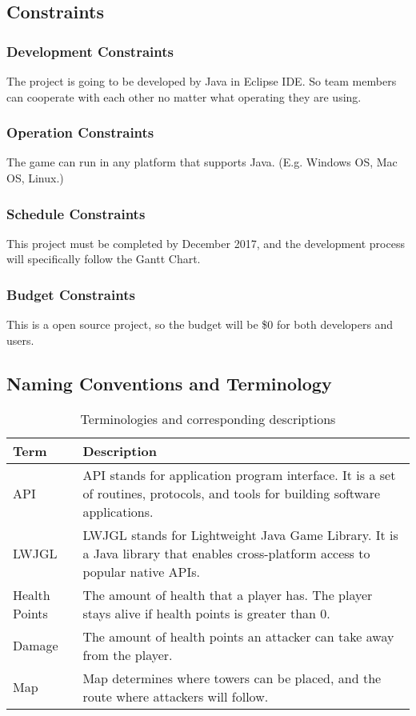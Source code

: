 \documentclass[12pt]{article}
\begin{document}
\subsection{Constraints}
\subsubsection{Development Constraints}
The project is going to be developed by Java in Eclipse IDE. So team members can cooperate with each other no matter what operating they are using.

\subsubsection{Operation Constraints}
The game can run in any platform that supports Java. (E.g. Windows OS, Mac OS, Linux.)

\subsubsection{Schedule Constraints}
This project must be completed by December 2017, and the development process will specifically follow the Gantt Chart.

\subsubsection{Budget Constraints}
This is a open source project, so the budget will be \$0 for both developers and users.


\subsection{Naming Conventions and Terminology}

\begin{table}[h!]
\centering
\begin{tabular}{ | m{5em} | m{10cm}|} 
\hline
Term & Description \\ 
\hline
API & API stands for application program interface. It is a set of routines, protocols, and tools for building software applications. \\ 
\hline
LWJGL & LWJGL stands for Lightweight Java Game Library. It is a Java library that enables cross-platform access to popular native APIs. \\ 
\hline
Health Points & The amount of health that a player has. The player stays alive if health points is greater than 0. \\ 
\hline
Damage & The amount of health points an attacker can take away from the player. \\ 
\hline
Map & Map determines where towers can be placed, and the route where attackers will follow.  \\
\hline
\end{tabular}
\caption{Terminologies and corresponding descriptions}
\label{table:1}
\end{table}
\end{document}
